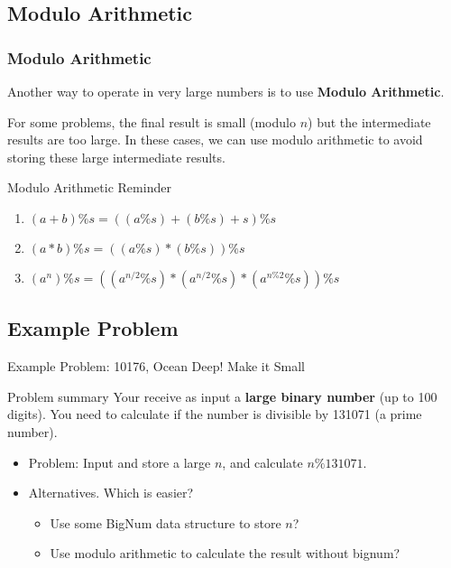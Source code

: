 \subsection{Modulo Arithmetic}
\begin{frame}
  \frametitle{Modulo Arithmetic}

  Another way to operate in very large numbers is to use {\bf Modulo Arithmetic}.\bigskip

  For some problems, the final result is small (modulo $n$) but the intermediate results are too large. In these cases, we can use modulo arithmetic to avoid storing these large intermediate results.\bigskip

  \begin{block}{Modulo Arithmetic Reminder}
    \begin{enumerate}
    \item $(a+b)\%s = ((a\%s)+(b\%s)+s)\%s$
    \item $(a*b)\%s = ((a\%s)*(b\%s))\%s$
    \item $(a^n)\%s = ((a^{n/2}\%s)*(a^{n/2}\%s)*(a^{n\%2}\%s))\%s$
    \end{enumerate}
  \end{block}
\end{frame}

\subsection{Example Problem}
\begin{frame}{Example Problem: 10176, Ocean Deep! Make it Small}
  \begin{block}{Problem summary}
    Your receive as input a {\bf large binary number} (up to 100 digits). You need to calculate if the number is divisible by 131071 (a prime number).
  \end{block}\bigskip

  \begin{itemize}
  \item Problem: Input and store a large $n$, and calculate $n\%131071$.
  \item Alternatives. Which is easier?
  \begin{itemize}
    \item Use some BigNum data structure to store $n$?
    \item Use modulo arithmetic to calculate the result without bignum?
  \end{itemize}

  \end{itemize}
\end{frame}

